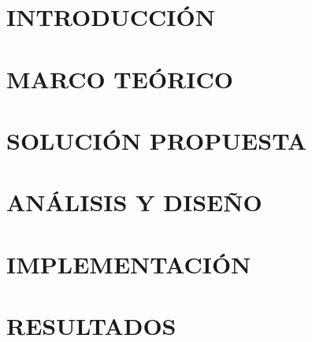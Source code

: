 \documentclass[12pt]{article}
\begin{document}

\setcounter{page}{1}
\renewcommand{\thepage}{\arabic{page}}

\section{INTRODUCCIÓN}


\newpage
\section{MARCO TEÓRICO}


\newpage
\section{SOLUCIÓN PROPUESTA}
%

\newpage
\section{ANÁLISIS Y DISEÑO}
%

\newpage
\section{IMPLEMENTACIÓN}
%

\newpage
\section{RESULTADOS}
%

\newpage
\end{document}
